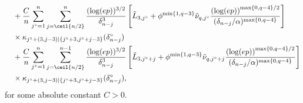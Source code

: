 \documentclass[aos]{imsart}
\begin{document}
\begin{appendix}
\begin{lemma}
\begin{equation*}
\begin{aligned}
        & \quad + \frac{C}{n} \sum_{j^\circ=1}^n \sum_{j=\ceil{n/2}}^{n} \frac{(\log(ep))^{3/2}}{\delta_{n-j}^3}
        \left[ 
            \tilde{L}_{3,j^\circ}
            + \phi^{\min\{1, q-3\}} \tilde\nu_{q,j^\circ} \frac{ {(\log(ep))}^{\max\{0, q-4\}/2}}{(\delta_{n-j}/\alpha)^{\max\{0, q-4\}}}
        \right] \\
        & \quad \times \kappa_{j^\circ+(3,j-3)|\{j^\circ+3,j^\circ+j-3\}}(\delta_{n-j}^\circ) \\
        & \quad + \frac{C}{n} \sum_{j^\circ=1}^n \sum_{j=\ceil{n/2}}^{n-1} \frac{(\log(ep))^{3/2}}{\delta_{n-j}^3}
        \left[ 
            \tilde{L}_{3,j^\circ+j}
            + \phi^{\min\{1, q-3\}} \tilde\nu_{q,j^\circ+j} \frac{ {(\log(ep))}^{\max\{0, q-4\}/2}}{(\delta_{n-j}/\alpha)^{\max\{0, q-4\}}}
        \right] \\
        & \quad \times \kappa_{j^\circ+(3,j-3)|\{j^\circ+3,j^\circ+j-3\}}(\delta_{n-j}^\circ),
    \end{aligned}
    \end{equation*}
    for some absolute constant $C > 0$.
\end{lemma}







\end{appendix}
\end{document}

